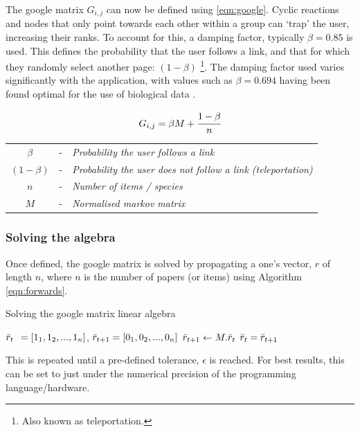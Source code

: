 The google matrix $G_{i,j}$ can now be defined using \autoref{eqn:google}.
 Cyclic reactions and nodes that only point towards each other within a group can `trap' the user, increasing their ranks. 
 To account for this, a damping factor, typically $\beta = 0.85$ is used. This defines the probability that the user follows a link, and that for which they randomly select another page: $(1-\beta)$ \footnote{Also known as teleportation.}. The damping factor used varies significantly with the application, with values such as $\beta = 0.694$ having been found optimal for the use of biological data \citep{biopr}.


\begin{center}
\begin{equation}
     G_{i,j} = \beta M + \cfrac{1 - \beta}{n}
 \label{eqn:google}
\end{equation}
\begin{tabular}{ccl}
$\beta$&-&\textit{Probability the user follows a link} \\
 $(1 - \beta)$&-&\textit{Probability the user does not follow a link (teleportation)} \\
$n$&-&\textit{Number of items / species}\\
$M$&-&\textit{Normalised markov matrix}
\end{tabular}
\end{center}


\subsubsection{Solving the algebra}

Once defined, the google matrix is solved by propagating a one's vector, $r$ of length $n$, where $n$ is the number of papers (or items) using Algorithm \ref{eqn:forwards}.


\begin{algorithm} \caption{Solving the google matrix linear algebra}
\begin{algorithmic}[1]
\State  $\Bar{r}_t \:\:= [1_1, 1_2, ... , 1_n]$, $\Bar{r}_{t+1} = [0_1, 0_2, ... , 0_n]$
\State
{}
\State $\Bar{r}_{t+1} \gets M . \Bar{r}_t$
\State $\Bar{r}_t = \Bar{r}_{t+1}$
\EndWhile
\end{algorithmic}\label{eqn:forwards}
\end{algorithm}


 This is repeated until a pre-defined tolerance, $\epsilon$ is reached. For best results, this can be set to just under the numerical precision of the programming language/hardware. 


